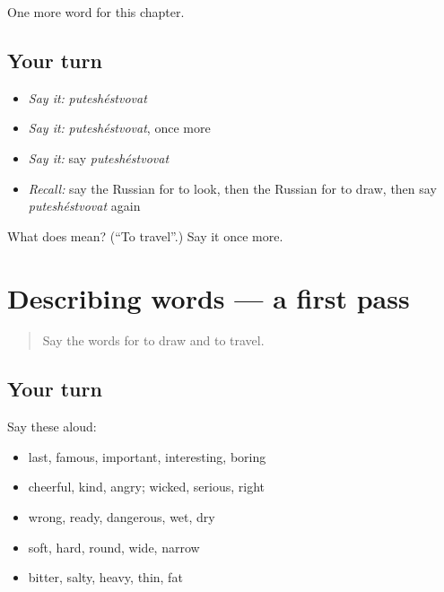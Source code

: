\begin{grammarlens}[title={What you've built}]
One more word for this chapter.
\end{grammarlens}

\subsection*{Your turn}
\begin{itemize}
\raggedright
  \item \emph{Say it:} \emph{puteshéstvovat}
  \item \emph{Say it:} \emph{puteshéstvovat}, once more
  \item \emph{Say it:} say \emph{puteshéstvovat}
  \item \emph{Recall:} say the Russian for to look, then the Russian for to draw, then say \emph{puteshéstvovat} again
\end{itemize}

\begin{tcolorbox}[breakable,colback=teal!4,colframe=teal!35!black,title={Before you move on}]
What does  mean? (\textquotedblleft{}To travel\textquotedblright{}.) Say it once more.
\end{tcolorbox}
\section[(dialogue)]{Describing words — a first pass}

\label{lesson:RU-R135-first-pass-describing-words}



\begin{quote}
Say the words for to draw and to travel.
\end{quote}

\subsection*{Your turn}
Say these aloud:

\begin{itemize}
\raggedright
  \item last, famous, important, interesting, boring
  \item cheerful, kind, angry; wicked, serious, right
  \item wrong, ready, dangerous, wet, dry
  \item soft, hard, round, wide, narrow
  \item bitter, salty, heavy, thin, fat
\end{itemize}

